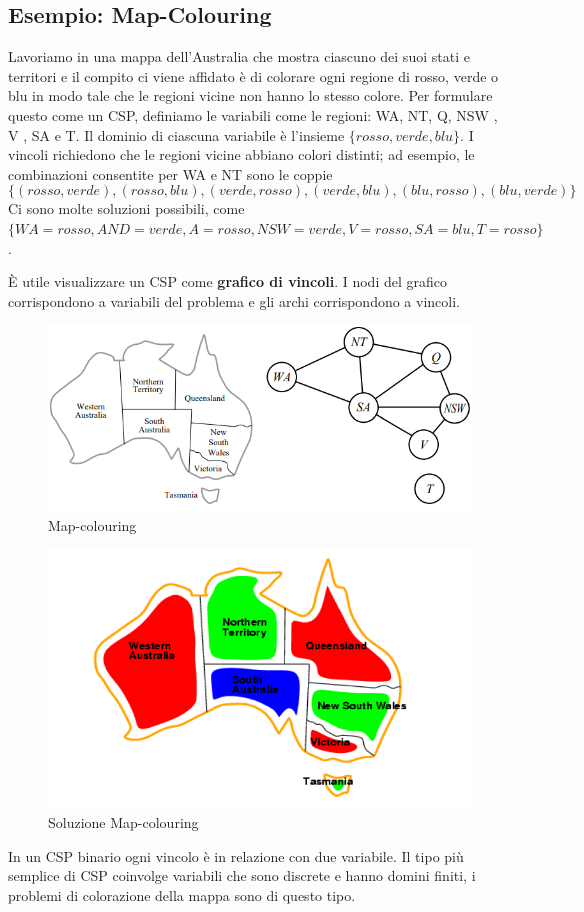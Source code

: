 \subsection{Esempio: Map-Colouring} 
Lavoriamo in una mappa dell'Australia che mostra ciascuno dei suoi stati e territori e il compito ci viene affidato è di colorare ogni regione di rosso, verde o blu in modo tale che le regioni vicine non hanno lo stesso colore. Per formulare questo come un CSP, definiamo le variabili come le regioni: WA, NT, Q, NSW , V , SA e T. Il dominio di ciascuna variabile è l'insieme $\{rosso, verde, blu\}$. I vincoli richiedono che le regioni vicine abbiano colori distinti; ad esempio, le combinazioni consentite per WA e NT sono le coppie 
\[\{(rosso, verde),(rosso, blu),(verde, rosso),(verde, blu),(blu, rosso),(blu, verde)\}\]
Ci sono molte soluzioni possibili, come  $\{WA = rosso, AND = verde, A = rosso, NSW = verde, V = rosso, SA = blu, T = rosso\}$.

È utile visualizzare un CSP come \textbf{grafico di vincoli}. I nodi
del grafico corrispondono a variabili del problema e gli archi corrispondono a vincoli.
\begin{figure}[H]
	\centering
    \includegraphics[width=15cm, keepaspectratio]{img/map_colouring.png}
	\caption{Map-colouring}\label{fig:map_colouring}
\end{figure}
\begin{figure}[H]
	\centering
    \includegraphics[width=14cm, keepaspectratio]{img/sol_map_coulouring.png}
	\caption{Soluzione Map-colouring}\label{fig:sol_map_colouring}
\end{figure}
In un CSP binario ogni vincolo è in relazione con due variabile. Il tipo più semplice di CSP coinvolge variabili che sono discrete e hanno domini finiti, i problemi di colorazione della mappa sono di questo tipo.
